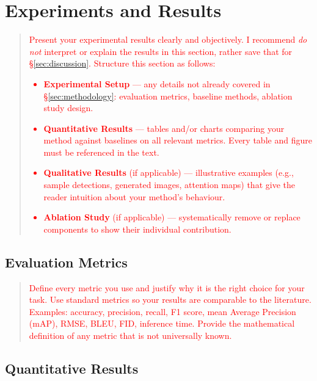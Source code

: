 \documentclass[journal, 10pt, twoside]{IEEEtran}
\begin{document}
\section{Experiments and Results}
\label{sec:results}

\begin{quote}
  \textcolor{red}{%
    Present your experimental results clearly and objectively.  I recommend \emph{do not} interpret or explain the results in this section, rather save that for \S\ref{sec:discussion}.  Structure this section as follows:%
    \begin{itemize}
      \item \textbf{Experimental Setup} --- any details not already covered in \S\ref{sec:methodology}: evaluation metrics, baseline methods, ablation study design. 
      \item \textbf{Quantitative Results} --- tables and/or charts comparing your method against baselines on all relevant metrics.  Every table and figure must be referenced in the text.
      \item \textbf{Qualitative Results} (if applicable) --- illustrative examples (e.g., sample detections, generated images, attention maps) that give the reader intuition about your method's behaviour.
      \item \textbf{Ablation Study} (if applicable) --- systematically remove or replace components to show their individual contribution.
    \end{itemize}%
  }
\end{quote}

\subsection{Evaluation Metrics}
\label{ssec:metrics}

\begin{quote}
  \textcolor{red}{%
    Define every metric you use and justify why it is the right choice for your task.  Use standard metrics so your results are comparable to the literature.  Examples: accuracy, precision, recall, F1 score, mean Average Precision (mAP), RMSE, BLEU, FID, inference time. Provide the mathematical definition of any metric that is not universally known.%
  }
\end{quote}

\subsection{Quantitative Results}
\label{ssec:quant}
\end{document}
